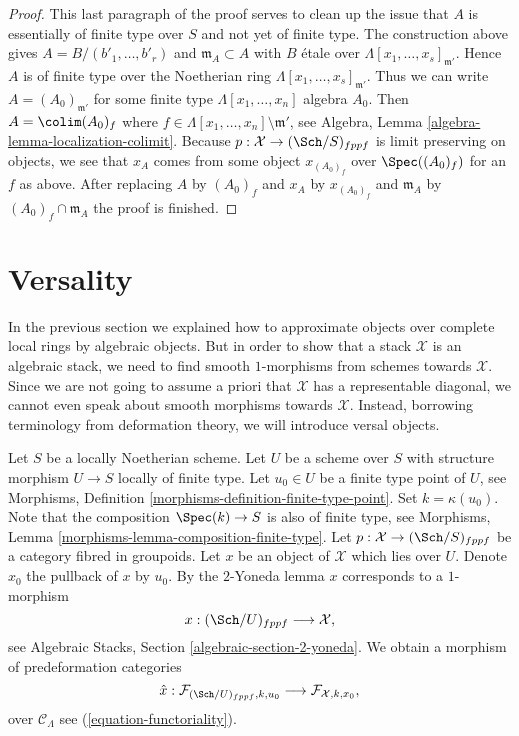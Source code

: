 \begin{proof}
\medskip\noindent
This last paragraph of the proof serves to clean up the issue that $A$ is
essentially of finite type over $S$ and not yet of finite type.
The construction above gives $A = B/(b'_1, \ldots, b'_r)$ and
$\mathfrak m_A \subset A$ with $B$ \'etale over
$\Lambda[x_1, \ldots, x_s]_{\mathfrak m'}$. Hence $A$ is of finite
type over the Noetherian ring $\Lambda[x_1, \ldots, x_s]_{\mathfrak m'}$.
Thus we can write $A = (A_0)_{\mathfrak m'}$ for some finite type
$\Lambda[x_1, \ldots, x_n]$ algebra $A_0$. Then
$A = \colim (A_0)_f$ where
$f \in \Lambda[x_1, \ldots, x_n] \setminus \mathfrak m'$, see
Algebra, Lemma \ref{algebra-lemma-localization-colimit}.
Because $p : \mathcal{X} \to (\Sch/S)_{fppf}$ is limit preserving on
objects, we see that
$x_A$ comes from some object $x_{(A_0)_f}$ over $\Spec((A_0)_f)$ for
an $f$ as above. After replacing $A$ by $(A_0)_f$ and $x_A$ by
$x_{(A_0)_f}$ and $\mathfrak m_A$ by $(A_0)_f \cap \mathfrak m_A$
the proof is finished.
\end{proof}






\section{Versality}
\label{section-versality}

\noindent
In the previous section we explained how to approximate objects over
complete local rings by algebraic objects. But in order to show that
a stack $\mathcal{X}$ is an algebraic stack, we need to find smooth
$1$-morphisms from schemes towards $\mathcal{X}$. Since we are not going
to assume a priori that $\mathcal{X}$ has a representable diagonal, we
cannot even speak about smooth morphisms towards $\mathcal{X}$. Instead,
borrowing terminology from deformation theory, we will introduce versal
objects.

\medskip\noindent
Let $S$ be a locally Noetherian scheme. Let $U$ be a scheme over $S$
with structure morphism $U \to S$ locally of finite type. Let
$u_0 \in U$ be a finite type point of $U$, see
Morphisms, Definition \ref{morphisms-definition-finite-type-point}.
Set $k = \kappa(u_0)$.
Note that the composition $\Spec(k) \to S$ is also of finite type,
see Morphisms, Lemma \ref{morphisms-lemma-composition-finite-type}.
Let $p : \mathcal{X} \to (\Sch/S)_{fppf}$ be a category fibred in groupoids.
Let $x$ be an object of $\mathcal{X}$ which lies over $U$. Denote $x_0$
the pullback of $x$ by $u_0$. By the $2$-Yoneda lemma $x$ corresponds
to a $1$-morphism
$$
x : (\Sch/U)_{fppf} \longrightarrow \mathcal{X},
$$
see Algebraic Stacks, Section \ref{algebraic-section-2-yoneda}. We obtain a
morphism of predeformation categories
\begin{equation}
\label{equation-hat-x}
\hat x :
\mathcal{F}_{(\Sch/U)_{fppf}, k, u_0}
\longrightarrow
\mathcal{F}_{\mathcal{X}, k, x_0},
\end{equation}
over $\mathcal{C}_\Lambda$ see (\ref{equation-functoriality}).

